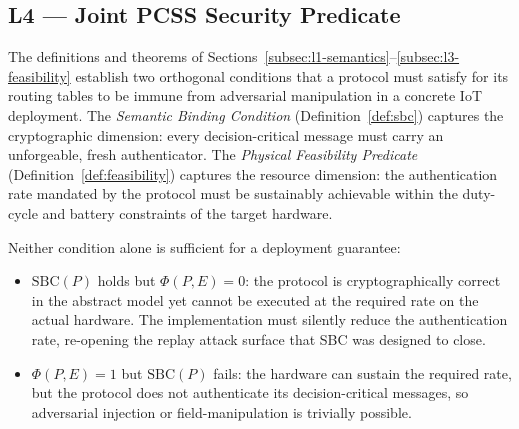 
\subsection{L4 — Joint PCSS Security Predicate}
\label{subsec:l4-pcss-joint}

The definitions and theorems of Sections~\ref{subsec:l1-semantics}–\ref{subsec:l3-feasibility}
establish two orthogonal conditions that a protocol must satisfy for its routing tables to be
immune from adversarial manipulation in a concrete IoT deployment.  The
\emph{Semantic Binding Condition} (Definition~\ref{def:sbc}) captures the
cryptographic dimension: every decision-critical message must carry an
unforgeable, fresh authenticator.  The \emph{Physical Feasibility
Predicate} (Definition~\ref{def:feasibility}) captures the resource
dimension: the authentication rate mandated by the protocol must be
sustainably achievable within the duty-cycle and battery constraints of
the target hardware.

Neither condition alone is sufficient for a deployment guarantee:
\begin{itemize}
  \item $\mathrm{SBC}(P)$ holds but $\Phi(P,E)=0$: the protocol is
        cryptographically correct in the abstract model yet cannot be
        executed at the required rate on the actual hardware.  The
        implementation must silently reduce the authentication rate,
        re-opening the replay attack surface that SBC was designed to close.

  \item $\Phi(P,E)=1$ but $\mathrm{SBC}(P)$ fails: the hardware can
        sustain the required rate, but the protocol does not authenticate
        its decision-critical messages, so adversarial injection or
        field-manipulation is trivially possible.
\end{itemize}

